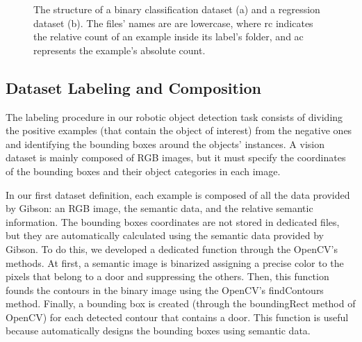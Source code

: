 \begin{figure}[h!]
	\centering
	\begin{subfigure}[b]{0.5\textwidth}
		\caption{}
		\label{fig:structureclassification}
	\end{subfigure}
	\begin{subfigure}[b]{0.4\textwidth}
		\caption{}
		\label{fig:structureregression}
	\end{subfigure}
	\caption{The structure of a binary classification dataset (a) and a regression dataset (b). The files' names are are lowercase, where \textsf{rc} indicates the relative count of an example inside its label's folder, and \textsf{ac} represents the example's absolute count. }
	\label{fig:structuredataset}
\end{figure}


\subsection{Dataset Labeling and Composition}
\label{sec:dataset_labeling}
The labeling procedure in our robotic object detection task consists of dividing the positive examples (that contain the object of interest) from the negative ones and identifying the bounding boxes around the objects' instances. A vision dataset is mainly composed of RGB images, but it must specify the coordinates of the bounding boxes and their object categories in each image.

In our first dataset definition, each example is composed of all the data provided by Gibson: an RGB image, the semantic data, and the relative semantic information. The bounding boxes coordinates are not stored in dedicated files, but they are automatically calculated using  the semantic data provided by Gibson. To do this, we developed a dedicated function through the OpenCV's methods. At first, a semantic image is binarized assigning a precise color to the pixels that belong to a door and suppressing the others. Then, this function founds the contours in the binary image using the OpenCV's \textsf{findContours} method. Finally, a bounding box is created (through the \textsf{boundingRect} method of OpenCV) for each detected contour that contains a door. This function is useful because automatically designs the bounding boxes using semantic data.

